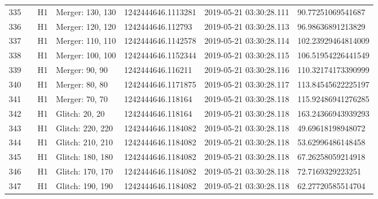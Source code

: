 \begin{longtable}{lllllll}
335  &                                                    &       H1 &  Merger: 130, 130 &  1242444646.1113281 &  2019-05-21 03:30:28.111 &   90.77251069541687 \\
336  &                                                    &       H1 &  Merger: 120, 120 &   1242444646.112793 &  2019-05-21 03:30:28.113 &   96.98636891213829 \\
337  &                                                    &       H1 &  Merger: 110, 110 &  1242444646.1142578 &  2019-05-21 03:30:28.114 &  102.23929464814009 \\
338  &                                                    &       H1 &  Merger: 100, 100 &  1242444646.1152344 &  2019-05-21 03:30:28.115 &  106.51954226441549 \\
339  &                                                    &       H1 &    Merger: 90, 90 &   1242444646.116211 &  2019-05-21 03:30:28.116 &  110.32174173390999 \\
340  &                                                    &       H1 &    Merger: 80, 80 &  1242444646.1171875 &  2019-05-21 03:30:28.117 &  113.84545622225197 \\
341  &                                                    &       H1 &    Merger: 70, 70 &   1242444646.118164 &  2019-05-21 03:30:28.118 &  115.92486941276285 \\
342  &                                                    &       H1 &    Glitch: 20, 20 &   1242444646.118164 &  2019-05-21 03:30:28.118 &  163.24366943939293 \\
343  &                                                    &       H1 &  Glitch: 220, 220 &  1242444646.1184082 &  2019-05-21 03:30:28.118 &   49.69618198948072 \\
344  &                                                    &       H1 &  Glitch: 210, 210 &  1242444646.1184082 &  2019-05-21 03:30:28.118 &   53.62996486148458 \\
345  &                                                    &       H1 &  Glitch: 180, 180 &  1242444646.1184082 &  2019-05-21 03:30:28.118 &   67.26258059214918 \\
346  &                                                    &       H1 &  Glitch: 170, 170 &  1242444646.1184082 &  2019-05-21 03:30:28.118 &    72.7169329223251 \\
347  &                                                    &       H1 &  Glitch: 190, 190 &  1242444646.1184082 &  2019-05-21 03:30:28.118 &   62.27720585514704 \\

\end{longtable}
